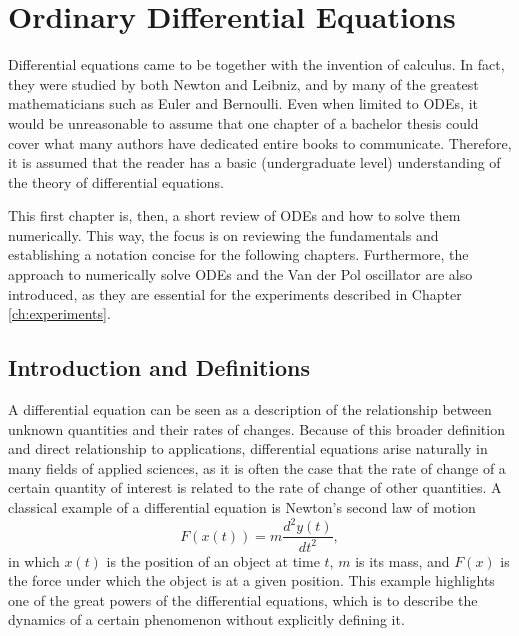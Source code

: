 \chapter{Ordinary Differential Equations}\label{ch:ode}

Differential equations came to be together with the invention of calculus.
In fact, they were studied by both Newton and Leibniz, and by many of the greatest mathematicians such as Euler and Bernoulli.
Even when limited to \gls{ODE}s, it would be unreasonable to assume that one chapter of a bachelor thesis could cover what many authors have dedicated entire books to communicate.
Therefore, it is assumed that the reader has a basic (undergraduate level) understanding of the theory of differential equations\footnotemark.

This first chapter is, then, a short review of \gls{ODE}s and how to solve them numerically.
This way, the focus is on reviewing the fundamentals and establishing a notation concise for the following chapters.
Furthermore, the approach to numerically solve \gls{ODE}s and the Van der Pol oscillator are also introduced, as they are essential for the experiments described in Chapter \ref{ch:experiments}.

\section{Introduction and Definitions}

A differential equation can be seen as a description of the relationship between unknown quantities and their rates of changes.
Because of this broader definition and direct relationship to applications, differential equations arise naturally in many fields of applied sciences\cite{hairer_solving_1993}, as it is often the case that the rate of change of a certain quantity of interest is related to the rate of change of other quantities.
A classical example of a differential equation is Newton's second law of motion \[
F\left( x\left( t \right) \right) = m \frac{d^2 y(t)}{d t^2}
,\] in which $x\left( t \right) $ is the position of an object at time $t$, $m$ is its mass, and $F(x)$ is the force under which the object is at a given position.
This example highlights one of the great powers of the differential equations, which is to describe the dynamics of a certain phenomenon without explicitly defining it.


